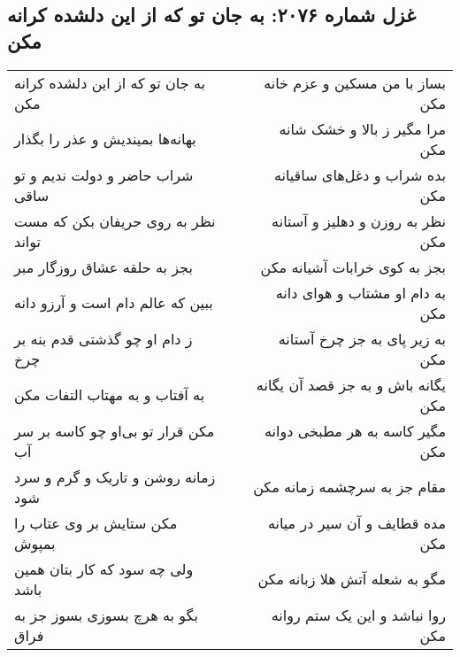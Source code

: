 \begin{center}
\section*{غزل شماره ۲۰۷۶: به جان تو که از این دلشده کرانه مکن}
\label{sec:2076}
\begin{longtable}{l p{0.5cm} r}
به جان تو که از این دلشده کرانه مکن
&&
بساز با من مسکین و عزم خانه مکن
\\
بهانه‌ها بمیندیش و عذر را بگذار
&&
مرا مگیر ز بالا و خشک شانه مکن
\\
شراب حاضر و دولت ندیم و تو ساقی
&&
بده شراب و دغل‌های ساقیانه مکن
\\
نظر به روی حریفان بکن که مست تواند
&&
نظر به روزن و دهلیز و آستانه مکن
\\
بجز به حلقه عشاق روزگار مبر
&&
بجز به کوی خرابات آشیانه مکن
\\
ببین که عالم دام است و آرزو دانه
&&
به دام او مشتاب و هوای دانه مکن
\\
ز دام او چو گذشتی قدم بنه بر چرخ
&&
به زیر پای به جز چرخ آستانه مکن
\\
به آفتاب و به مهتاب التفات مکن
&&
یگانه باش و به جز قصد آن یگانه مکن
\\
مکن قرار تو بی‌او چو کاسه بر سر آب
&&
مگیر کاسه به هر مطبخی دوانه مکن
\\
زمانه روشن و تاریک و گرم و سرد شود
&&
مقام جز به سرچشمه زمانه مکن
\\
مکن ستایش بر وی عتاب را بمپوش
&&
مده قطایف و آن سیر در میانه مکن
\\
ولی چه سود که کار بتان همین باشد
&&
مگو به شعله آتش هلا زبانه مکن
\\
بگو به هرچ بسوزی بسوز جز به فراق
&&
روا نباشد و این یک ستم روانه مکن
\\
\end{longtable}
\end{center}
